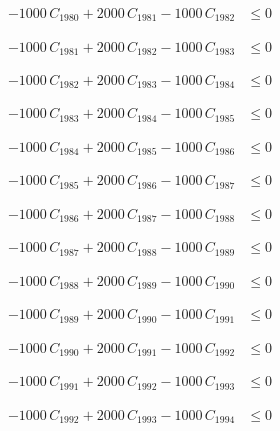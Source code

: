 \documentclass[a4paper,11pt]{article}
\begin{document}
\begin{align}
-1000\,C_{1980} + 2000\,C_{1981} - 1000\,C_{1982} &\leq 0 \nonumber
\end{align}

\begin{align}
-1000\,C_{1981} + 2000\,C_{1982} - 1000\,C_{1983} &\leq 0 \nonumber
\end{align}

\begin{align}
-1000\,C_{1982} + 2000\,C_{1983} - 1000\,C_{1984} &\leq 0 \nonumber
\end{align}

\begin{align}
-1000\,C_{1983} + 2000\,C_{1984} - 1000\,C_{1985} &\leq 0 \nonumber
\end{align}

\begin{align}
-1000\,C_{1984} + 2000\,C_{1985} - 1000\,C_{1986} &\leq 0 \nonumber
\end{align}

\begin{align}
-1000\,C_{1985} + 2000\,C_{1986} - 1000\,C_{1987} &\leq 0 \nonumber
\end{align}

\begin{align}
-1000\,C_{1986} + 2000\,C_{1987} - 1000\,C_{1988} &\leq 0 \nonumber
\end{align}

\begin{align}
-1000\,C_{1987} + 2000\,C_{1988} - 1000\,C_{1989} &\leq 0 \nonumber
\end{align}

\begin{align}
-1000\,C_{1988} + 2000\,C_{1989} - 1000\,C_{1990} &\leq 0 \nonumber
\end{align}

\begin{align}
-1000\,C_{1989} + 2000\,C_{1990} - 1000\,C_{1991} &\leq 0 \nonumber
\end{align}

\begin{align}
-1000\,C_{1990} + 2000\,C_{1991} - 1000\,C_{1992} &\leq 0 \nonumber
\end{align}

\begin{align}
-1000\,C_{1991} + 2000\,C_{1992} - 1000\,C_{1993} &\leq 0 \nonumber
\end{align}

\begin{align}
-1000\,C_{1992} + 2000\,C_{1993} - 1000\,C_{1994} &\leq 0 \nonumber
\end{align}
\end{document}
